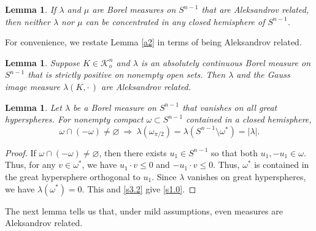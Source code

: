 \documentclass{cpamart1}     %
\newtheorem{lemm}[theo]{Lemma}
\theoremstyle{definition}
\theoremstyle{remark}
\newcommand{\sn}{S^{n-1}}
\newcommand{\kno}{\mathcal K^n_o}
\begin{document}
\begin{lemm}\label{new88}
If $\lambda$ and $\mu$ are Borel measures on $\sn$ that are Aleksandrov related,
then neither $\lambda$ nor $\mu$ can be concentrated in any closed hemisphere of $\sn$.
\end{lemm}






For convenience, we restate Lemma \ref{a2} in terms of being Aleksandrov related.

\begin{lemm}\label{s4}
Suppose $K\in \kno$ and $\lambda$ is
an absolutely continuous Borel measure on $\sn$
that is strictly positive on nonempty open sets. Then $\lambda$ and the
Gauss image measure $\lambda(K,\cdot\,)$ are Aleksandrov related.
\end{lemm}



\begin{lemm}\label{s3}
Let $\lambda$ be a Borel measure on $\sn$ that vanishes on all great hyperspheres.
For nonempty compact $\omega\subset S^{n-1}$ contained in  a closed hemisphere,
\begin{equation} \label{s1.0}
\omega\cap(-\omega)\neq \varnothing \ \Rightarrow \
\lambda(\omega_{\pi/2})=\lambda(\sn\setminus\omega^*)=|\lambda|.
\end{equation}
\end{lemm}

\begin{proof}
If $\omega\cap(-\omega)\neq \varnothing$, then there exists $u_1\in \sn$ so that
both $u_1, -u_1 \in \omega$. Thus, for any $v\in \omega^*$, we have
$u_1\cdot v\le 0$ and $-u_1\cdot v\le0$. Thus,
$\omega^*$ is contained in the great hypersphere orthogonal to $u_1$.
Since $\lambda$  vanishes on great hyperspheres, we have
$\lambda(\omega^*)=0$. This and \eqref{s3.2} give \eqref{s1.0}.
\end{proof}




The next lemma tells us that, under mild assumptions, even measures are Aleksandrov related.
\end{document}
